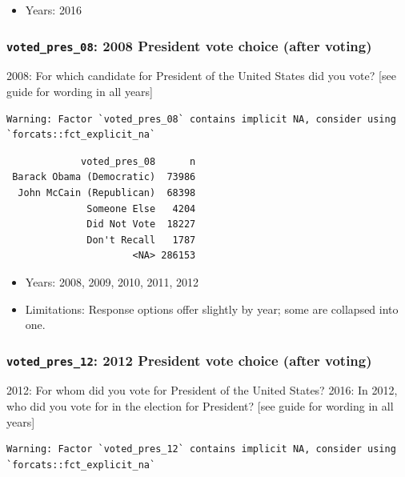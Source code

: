 \documentclass[10pt,article,oneside]{memoir}
\theoremstyle{definition}
\begin{document}
\begin{itemize}
\tightlist
\item
  Years: 2016
\end{itemize}

\hypertarget{voted_pres_08-2008-president-vote-choice-after-voting}{%
\subsubsection{\texorpdfstring{\texttt{voted\_pres\_08}: 2008 President
vote choice (after
voting)}{voted\_pres\_08: 2008 President vote choice (after voting)}}\label{voted_pres_08-2008-president-vote-choice-after-voting}}

2008: For which candidate for President of the United States did you
vote? {[}see guide for wording in all years{]}

\begin{verbatim}
Warning: Factor `voted_pres_08` contains implicit NA, consider using
`forcats::fct_explicit_na`
\end{verbatim}

\begin{verbatim}
             voted_pres_08      n
 Barack Obama (Democratic)  73986
  John McCain (Republican)  68398
              Someone Else   4204
              Did Not Vote  18227
              Don't Recall   1787
                      <NA> 286153
\end{verbatim}

\begin{itemize}
\tightlist
\item
  Years: 2008, 2009, 2010, 2011, 2012
\item
  Limitations: Response options offer slightly by year; some are
  collapsed into one.
\end{itemize}

\hypertarget{voted_pres_12-2012-president-vote-choice-after-voting}{%
\subsubsection{\texorpdfstring{\texttt{voted\_pres\_12}: 2012 President
vote choice (after
voting)}{voted\_pres\_12: 2012 President vote choice (after voting)}}\label{voted_pres_12-2012-president-vote-choice-after-voting}}

2012: For whom did you vote for President of the United States? 2016: In
2012, who did you vote for in the election for President? {[}see guide
for wording in all years{]}

\begin{verbatim}
Warning: Factor `voted_pres_12` contains implicit NA, consider using
`forcats::fct_explicit_na`
\end{verbatim}
\end{document}
